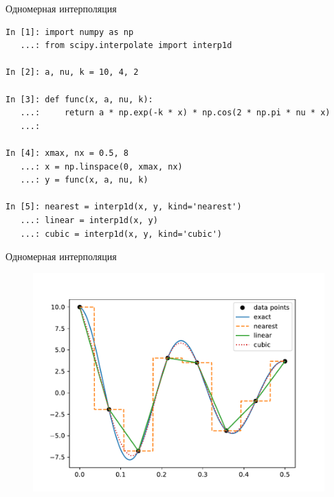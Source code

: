 \documentclass[aspectratio=169, mathserif]{beamer}	%
\begin{document}
\begin{frame}[fragile]{Одномерная интерполяция}
\scriptsize
\begin{lstlisting}[language=iPython, numbers=none, frame=none ]
In [1]: import numpy as np
   ...: from scipy.interpolate import interp1d

In [2]: a, nu, k = 10, 4, 2

In [3]: def func(x, a, nu, k):
   ...:     return a * np.exp(-k * x) * np.cos(2 * np.pi * nu * x)
   ...:

In [4]: xmax, nx = 0.5, 8
   ...: x = np.linspace(0, xmax, nx)
   ...: y = func(x, a, nu, k)

In [5]: nearest = interp1d(x, y, kind='nearest')
   ...: linear = interp1d(x, y)
   ...: cubic = interp1d(x, y, kind='cubic')
\end{lstlisting}
\vfill
\end{frame}

\begin{frame}[fragile]{Одномерная интерполяция}
\scriptsize
\begin{figure}[h!]
	\centering
	\includegraphics[width=.7\linewidth]{./pics/Figure_37}
\end{figure}
\vfil
\end{frame}
\end{document}

